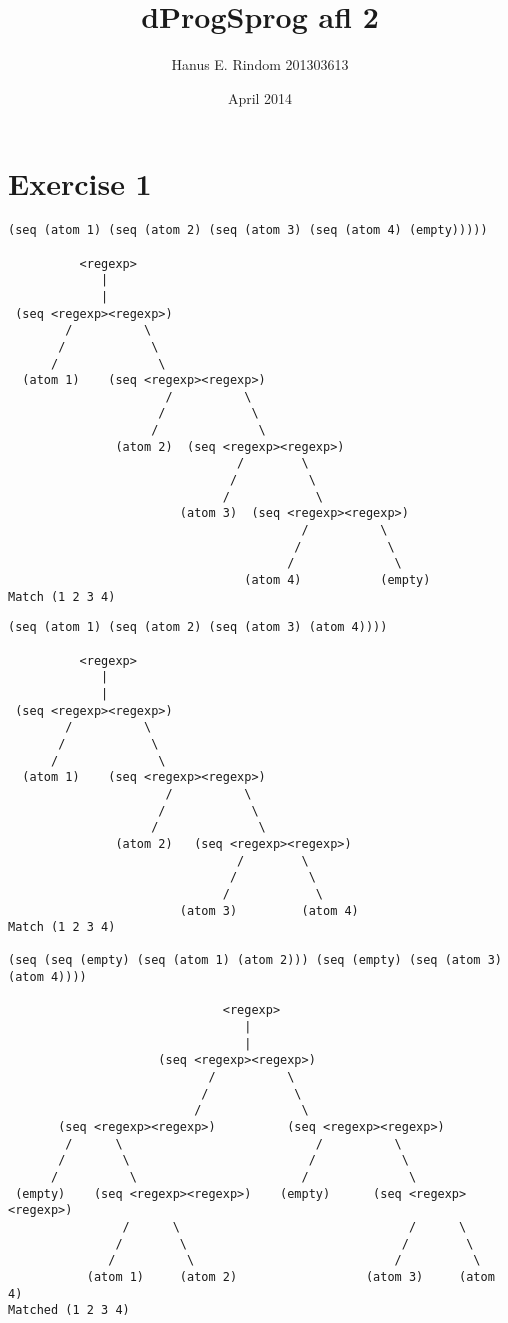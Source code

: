 \documentclass{article}
\title{dProgSprog afl 2}
\author{Hanus E. Rindom 201303613}
\date{April 2014}
\begin{document}
\maketitle

\section*{Exercise 1}
\begin{verbatim}
(seq (atom 1) (seq (atom 2) (seq (atom 3) (seq (atom 4) (empty)))))

          <regexp>
             |
             |
 (seq <regexp><regexp>)
        /          \
       /            \
      /              \
  (atom 1)    (seq <regexp><regexp>)
                      /          \
                     /            \
                    /              \
               (atom 2)  (seq <regexp><regexp>)
                                /        \
                               /          \
                              /            \
                        (atom 3)  (seq <regexp><regexp>)
                                         /          \
                                        /            \
                                       /              \
                                 (atom 4)           (empty)
Match (1 2 3 4)
\end{verbatim}
\newpage
\begin{verbatim}
(seq (atom 1) (seq (atom 2) (seq (atom 3) (atom 4))))

          <regexp>
             |
             |
 (seq <regexp><regexp>)
        /          \
       /            \
      /              \
  (atom 1)    (seq <regexp><regexp>)
                      /          \
                     /            \
                    /              \
               (atom 2)   (seq <regexp><regexp>)
                                /        \
                               /          \
                              /            \
                        (atom 3)         (atom 4)
Match (1 2 3 4)

(seq (seq (empty) (seq (atom 1) (atom 2))) (seq (empty) (seq (atom 3) (atom 4))))

                              <regexp>
                                 |
                                 |
                     (seq <regexp><regexp>)
                            /          \
                           /            \
                          /              \
       (seq <regexp><regexp>)          (seq <regexp><regexp>)
        /      \                           /          \
       /        \                         /            \
      /          \                       /              \
 (empty)    (seq <regexp><regexp>)    (empty)      (seq <regexp><regexp>)
                /      \                                /      \  
               /        \                              /        \  
              /          \                            /          \  
           (atom 1)     (atom 2)                  (atom 3)     (atom 4)
Matched (1 2 3 4)
\end{verbatim}
\end{document}

